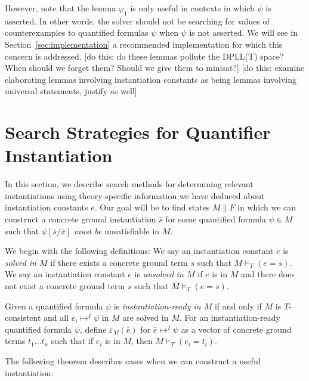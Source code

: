 \documentclass{llncs}
\begin{document}
However, note that the lemma $\varphi_1$ is only useful in contexts in which $\psi$ is asserted.
In other words, the solver should not be searching for values of counterexamples to quantified formulas $\psi$ when $\psi$ is not asserted.
We will see in Section~\ref{sec:implementation} a recommended implementation for which this concern is addressed.
[do this: do these lemmas pollute the DPLL(T) space?  When should we forget them?  Should we give them to minisat?]
[do this: examine elaborating lemmas involving instantiation constants as being lemmas involving universal statements, justify as well]

\section{Search Strategies for Quantifier Instantiation}

In this section, we describe search methods for determining relevant instantiations using theory-specific information we have deduced about instantiation constants $\bar{e}$.
Our goal will be to find states $M \parallel F$ in which we can construct a concrete ground instantiation $\bar{s}$ for some quantified formula $\psi \in M$ such that $\psi [\bar{s}/\bar{x}]$ \emph{must be} unsatisfiable in $M$.

We begin with the following definitions:
We say an instantiation constant $e$ is \emph{solved in $M$} if there exists a concrete ground term $s$ such that $M \models_T (e = s)$.
We say an instantiation constant $e$ is \emph{unsolved in $M$} if $e$ is in $M$ and there does not exist a concrete ground term $s$ such that $M \models_T (e = s)$.

Given a quantified formula $\psi$ is \emph{instantiation-ready in $M$} if and only if $M$ is $T$-consistent and all $e_i \mapsto^I \psi$ in $M$ are solved in $M$.
For an instantiation-ready quantified formula $\psi$, define $\varepsilon_M( \bar{e} )$ for $\bar{e} \mapsto^I \psi$ as a vector of concrete ground terms $t_1 \ldots t_n$ such that if $e_i$ is in $M$, then $M \models_T (e_i = t_i)$.

The following theorem describes cases when we can construct a useful instantiation:
\end{document}
